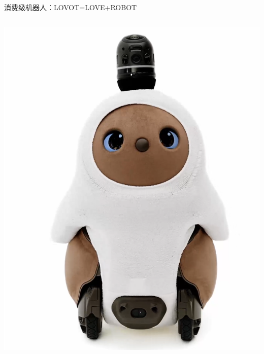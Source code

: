 \documentclass{beamer}
\begin{document}
\begin{frame}{消费级机器人：LOVOT=LOVE+ROBOT}
\begin{columns}[c, onlytextwidth]
\begin{column}{0.35\textwidth}
\includegraphics[width=1.1\textwidth]{family/1.png}
\end{column}
\end{columns}

\end{frame}
\end{document}
